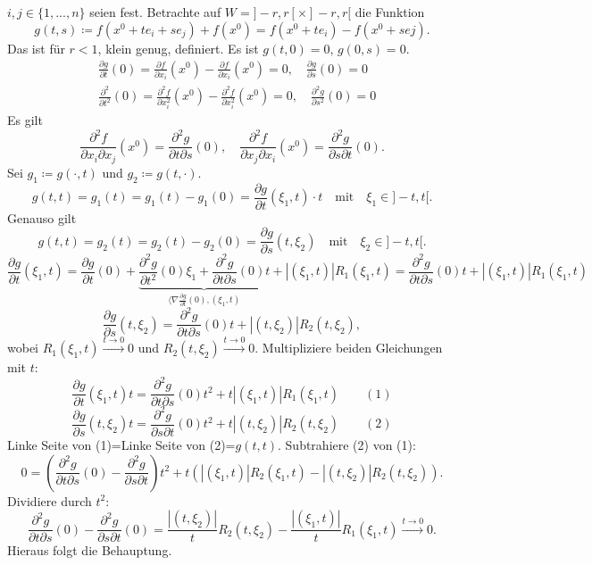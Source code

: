 \begin{beweis}
	$ i,j\in\lbrace 1,...,n\rbrace $ seien fest. Betrachte auf $ W=]-r,r[\times]-r,r[ $ die Funktion \[ g(t,s)\coloneqq f(x^0+te_i+se_j)+f(x^0)=f(x^0+te_i)-f(x^0+sej). \]
	Das ist f\"ur $ r<1 $, klein genug, definiert. Es ist $ g(t,0)=0 $, $ g(0,s)=0 $.
	\begin{align*} &\frac{\partial g}{\partial t}(0)=\frac{\partial f}{\partial x_i}(x^0)-\frac{\partial f}{\partial x_i}(x^0)=0,\quad \frac{\partial g}{\partial s}(0)=0\\&\frac{\partial^2}{\partial t^2}(0)=\frac{\partial^2 f}{\partial x_i^2}(x^0)-\frac{\partial^2 f}{\partial x_i^2}(x^0)=0,\quad \frac{\partial^2 g}{\partial s^2}(0)=0 \end{align*}
	Es gilt
	\[ \frac{\partial^2 f}{\partial x_i\partial x_j}(x^0)=\frac{\partial^2 g}{\partial t\partial s}(0),\quad \frac{\partial^2 f}{\partial x_j\partial x_i}(x^0)=\frac{\partial^2 g}{\partial s\partial t}(0). \]
	Sei $ g_1\coloneqq g(\cdot, t) $ und $ g_2\coloneqq g(t,\cdot) $.
	\[ g(t,t)=g_1(t)=g_1(t)-g_1(0)=\frac{\partial g}{\partial t}(\xi_1,t)\cdot t\quad\text{mit}\quad \xi_1\in]-t,t[. \]
	Genauso gilt
	\[ g(t,t)=g_2(t)=g_2(t)-g_2(0)=\frac{\partial g}{\partial s}(t,\xi_2)\quad\text{mit}\quad \xi_2\in]-t,t[. \]
	\[ \frac{\partial g}{\partial t}(\xi_1,t)=\frac{\partial g}{\partial t}(0)+\underbrace{\frac{\partial^2 g}{\partial t^2}(0)\xi_1+\frac{\partial^2 g}{\partial t\partial s}(0)t}_{\langle\nabla\tfrac{\partial g}{\partial t}(0),(\xi_1,t)}+|(\xi_1,t)|R_1(\xi_1,t)=\frac{\partial^2 g}{\partial t\partial s}(0)t+|(\xi_1,t)|R_1(\xi_1,t) \]
	\[ \frac{\partial g}{\partial s}(t,\xi_2)=\frac{\partial^2 g}{\partial t\partial s}(0)t+|(t,\xi_2)|R_2(t,\xi_2), \]
	wobei $ R_1(\xi_1,t)\xrightarrow{t\to 0}0 $ und $ R_2(t,\xi_2)\xrightarrow{t\to 0}0 $. Multipliziere beiden Gleichungen mit $ t $:
	\[ \frac{\partial g}{\partial t}(\xi_1,t)t=\frac{\partial^2 g}{\partial t\partial s}(0)t^2+t|(\xi_1,t)|R_1(\xi_1,t)\qquad(1) \]
	\[ \frac{\partial g}{\partial s}(t,\xi_2)t=\frac{\partial^2 g}{\partial s\partial t}(0)t^2+t|(t,\xi_2)|R_2(t,\xi_2)\qquad(2) \]
	Linke Seite von (1)=Linke Seite von (2)=$ g(t,t) $. Subtrahiere (2) von (1):
	\[ 0=\left(\frac{\partial^2 g}{\partial t\partial s}(0)-\frac{\partial^2 g}{\partial s\partial t}\right)t^2+t(|(\xi_1,t)|R_2(\xi_1,t)-|(t,\xi_2)|R_2(t,\xi_2)). \]
	Dividiere durch $ t^2 $:
	\[ \frac{\partial^2 g}{\partial t\partial s}(0)-\frac{\partial ^2 g}{\partial s\partial t}(0)=\frac{|(t,\xi_2)|}{t}R_2(t,\xi_2)-\frac{|(\xi_1,t)|}{t}R_1(\xi_1,t)\xrightarrow[]{t\to 0}0. \]
	Hieraus folgt die Behauptung.
\end{beweis}

